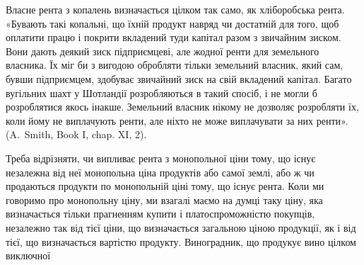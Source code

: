 Власне рента з копалень визначається цілком так само, як хліборобська
рента. «Бувають такі копальні, що їхній продукт навряд чи достатній для того,
щоб оплатити працю і покрити вкладений туди капітал разом з звичайним
зиском. Вони дають деякий зиск підприємцеві, але жодної ренти для земельного
власника. Їх міг би з вигодою обробляти тільки земельний власник, який сам,
бувши підприємцем, здобуває звичайний зиск на свій вкладений капітал. Багато
вугільних шахт у Шотландії розробляються в такий спосіб, і не могли б
розроблятися якось інакше. Земельний власник нікому не дозволяє розробляти
їх, коли йому не виплачують ренти, але ніхто не може виплачувати за них
ренти». (A.~Smith, Book I, chap. XI, 2).

Треба відрізняти, чи випливає рента з монопольної ціни тому, що існує
незалежна від неї монопольна ціна продуктів або самої землі, або ж чи продаються
продукти по монопольній ціні тому, що існує рента. Коли ми говоримо
про монопольну ціну, ми взагалі маємо на думці таку ціну, яка визначається
тільки прагненням купити і платоспроможністю покупців, незалежно так від
тієї ціни, що визначається загальною ціною продукції, як і від тієї, що визначається
вартістю продукту. Виноградник, що продукує вино цілком виключної
\parbreak{}  %
